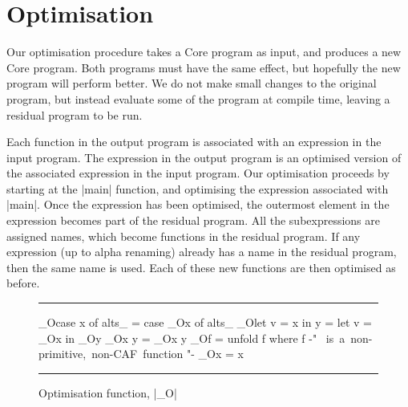 \documentclass{llncs}
\newenvironment{fig}
    {\begin{figure}[tbp]\hrule}
    {\end{figure}}
\newcommand{\figend}{\hrule}
\begin{document}
\section{Optimisation}
\label{sec:optimisation}

Our optimisation procedure takes a Core program as input, and produces a new Core program. Both programs must have the same effect, but hopefully the new program will perform better. We do not make small changes to the original program, but instead evaluate some of the program at compile time, leaving a residual program to be run.

Each function in the output program is associated with an expression in the input program. The expression in the output program is an optimised version of the associated expression in the input program. Our optimisation proceeds by starting at the |main| function, and optimising the expression associated with |main|. Once the expression has been optimised, the outermost element in the expression becomes part of the residual program. All the subexpressions are assigned names, which become functions in the residual program. If any expression (up to alpha renaming) already has a name in the residual program, then the same name is used. Each of these new functions are then optimised as before.

\begin{fig}
\begin{code}
_O\<case x of alts_  \> =  case _O\<x\> \? of alts_
_O\<let v = x in y   \> =  let v = _O\<x\> \? in _O\<y\>
_O\<x y              \> =  _O\<x\> \? y
_O\<f                \> =  unfold f
                           where f {-" \hbox{ is a non-primitive, non-CAF function} "-}
_O\<x                \> =  x
\end{code}
\figend
\caption{Optimisation function, |_O|}
\label{fig:optimise}
\end{fig}
\end{document}
